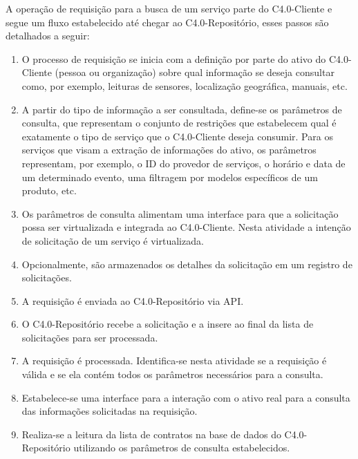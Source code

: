 A operação de requisição para a busca de um serviço parte do C4.0-Cliente e segue um fluxo estabelecido até chegar ao C4.0-Repositório, esses passos são detalhados a seguir:

\begin{enumerate}

	\item O processo de requisição se inicia com a definição por parte do ativo do C4.0-Cliente (pessoa ou organização) sobre qual informação se deseja consultar como, por exemplo, leituras de sensores, localização geográfica, manuais, etc.

	\item A partir do tipo de informação a ser consultada, define-se os parâmetros de consulta, que representam o conjunto de restrições que estabelecem qual é exatamente o tipo de serviço que o C4.0-Cliente deseja consumir. Para os serviços que visam a extração de informações do ativo, os parâmetros representam, por exemplo, o ID do provedor de serviços, o horário e data de um determinado evento, uma filtragem por modelos específicos de um produto, etc.

	\item Os parâmetros de consulta alimentam uma interface para que a solicitação possa ser virtualizada e integrada ao C4.0-Cliente. Nesta atividade a intenção de solicitação de um serviço é virtualizada.

	\item Opcionalmente, são armazenados os detalhes da solicitação em um registro de solicitações.

	\item A requisição é enviada ao C4.0-Repositório via API.

	\item O C4.0-Repositório recebe a solicitação e a insere ao final da lista de solicitações para ser processada.

	\item A requisição é processada. Identifica-se nesta atividade se a requisição é válida e se ela contém todos os parâmetros necessários para a consulta.

	\item Estabelece-se uma interface para a interação com o ativo real para a consulta das informações solicitadas na requisição.

	\item Realiza-se a leitura da lista de contratos na base de dados do C4.0-Repositório utilizando os parâmetros de consulta estabelecidos.

\end{enumerate}

